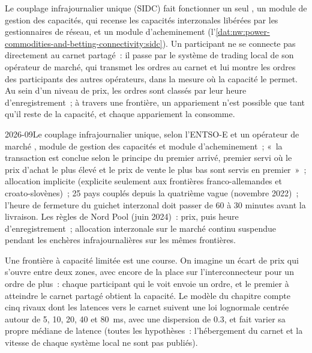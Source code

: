 Le couplage infrajournalier unique (SIDC) fait fonctionner un seul , un
module de gestion des capacités, qui recense les capacités interzonales libérées par les gestionnaires de réseau, et un module d'acheminement
(l'\cref{dat:nw:power-commodities-and-betting-connectivity:sidc}). Un participant ne se connecte pas directement au carnet partagé~: il
passe par le système de trading local de son opérateur de marché, qui transmet les ordres au carnet et lui montre les ordres des
participants des autres opérateurs, dans la mesure où la capacité le permet. Au sein d'un niveau de prix, les ordres sont classés par leur heure d'enregistrement~; à travers une
frontière, un appariement n'est possible que tant qu'il reste de la capacité, et chaque appariement la consomme.

\begin{dated}{2026-09}{Le couplage infrajournalier unique, selon l'ENTSO-E et un opérateur de marché}\label{dat:nw:power-commodities-and-betting-connectivity:sidc}
, module de gestion des capacités et module d'acheminement~; «~la transaction est conclue selon le principe du premier arrivé, premier servi
où le prix d'achat le plus élevé et le prix de vente le plus bas sont servis en premier~»~; allocation implicite (explicite seulement aux frontières franco-allemandes
et croato-slovènes)~; 25 pays couplés depuis la quatrième vague (novembre 2022)~; l'heure de fermeture du guichet interzonal doit passer
de 60 à 30 minutes avant la livraison. Les règles de Nord Pool (juin 2024)~: prix, puis heure d'enregistrement~; allocation interzonale sur le marché continu
suspendue pendant les enchères infrajournalières sur les mêmes frontières.
\end{dated}

Une frontière à capacité limitée est une course. On imagine un écart de prix qui s'ouvre entre deux zones, avec encore de la place sur l'interconnecteur pour un
ordre de plus~: chaque participant qui le voit envoie un ordre, et le premier à atteindre le carnet partagé obtient la capacité. Le modèle du chapitre
compte cinq rivaux dont les latences vers le carnet suivent une loi lognormale centrée autour de 5, 10, 20, 40 et \qty{80}{\milli\second}, avec une dispersion de 0.3, et
fait varier sa propre médiane de latence (toutes les hypothèses~: l'hébergement du carnet et la vitesse de chaque système local ne sont pas publiés).

